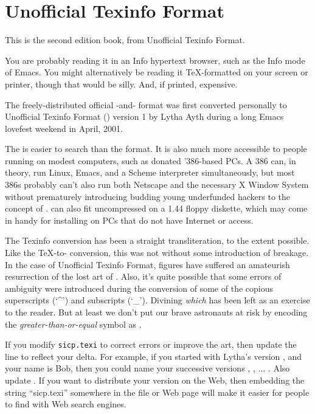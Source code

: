 \label{Top}

\chapter*{Unofficial Texinfo Format}
\label{UTF}

This is the second edition  book, from Unofficial Texinfo
Format.

You are probably reading it in an Info hypertext browser, such as the Info
mode of Emacs.  You might alternatively be reading it {\TeX}-formatted on your
screen or printer, though that would be silly.  And, if printed, expensive.

The freely-distributed official -and- format was
first converted personally to Unofficial Texinfo Format ()
version 1 by Lytha Ayth during a long Emacs lovefest weekend in April, 2001.

The  is easier to search than the  format.  It is
also much more accessible to people running on modest computers, such as
donated '386-based PCs.  A 386 can, in theory, run Linux, Emacs, and a Scheme
interpreter simultaneously, but most 386s probably can't also run both Netscape
and the necessary X Window System without prematurely introducing budding young
underfunded hackers to the concept of .   can also fit
uncompressed on a 1.44 floppy diskette, which may come in handy for
installing  on PCs that do not have Internet or  access.

The Texinfo conversion has been a straight transliteration, to the extent
possible.  Like the {\TeX}-to- conversion, this was not without
some introduction of breakage.  In the case of Unofficial Texinfo Format,
figures have suffered an amateurish resurrection of the lost art of
.  Also, it's quite possible that some errors of ambiguity
were introduced during the conversion of some of the copious superscripts (`\^{}')
and subscripts (`\_').  Divining \emph{which} has been left as an exercise to
the reader. But at least we don't put our brave astronauts at risk by encoding
the \emph{greater-than-or-equal} symbol as .

If you modify \texttt{sicp.texi} to correct errors or improve the
 art, then update the 
line to reflect your delta.  For example, if you started with Lytha's version
, and your name is Bob, then you could name your successive versions
, , \( \dots \) .  Also update
.  If you want to distribute your version on the Web, then
embedding the string ``sicp.texi'' somewhere in the file or Web page will make
it easier for people to find with Web search engines.

